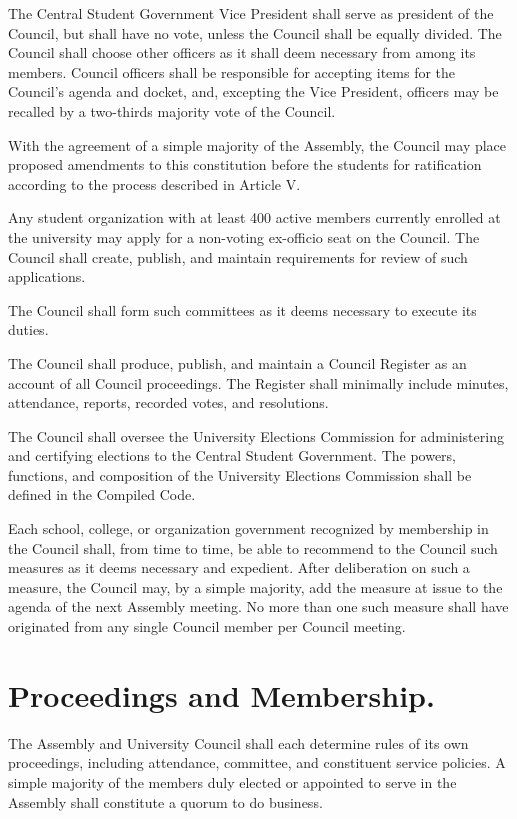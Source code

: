     The Central Student Government Vice President shall serve as president of the Council, but shall have no vote, unless the Council shall be equally divided. The Council shall choose other officers as it shall deem necessary from among its members. Council officers shall be responsible for accepting items for the Council's agenda and docket, and, excepting the Vice President, officers may be recalled by a two-thirds majority vote of the Council.
 
    With the agreement of a simple majority of the Assembly, the Council may place proposed amendments to this constitution before the students for ratification according to the process described in Article V.

    Any student organization with at least 400 active members currently enrolled at the university may apply for a non-voting ex-officio seat on the Council. The Council shall create, publish, and maintain requirements for review of such applications.

    The Council shall form such committees as it deems necessary to execute its duties.

    The Council shall produce, publish, and maintain a Council Register as an account of all Council proceedings. The Register shall minimally include minutes, attendance, reports, recorded votes, and resolutions.

    The Council shall oversee the University Elections Commission for administering and certifying elections to the Central Student Government. The powers, functions, and composition of the University Elections Commission shall be defined in the Compiled Code.

    Each school, college, or organization government recognized by membership in the Council shall, from time to time, be able to recommend to the Council such measures as it deems necessary and expedient. After deliberation on such a measure, the Council may, by a simple majority, add the measure at issue to the agenda of the next Assembly meeting. No more than one such measure shall have originated from any single Council member per Council meeting.

\section{Proceedings and Membership.}
    The Assembly and University Council shall each determine rules of its own proceedings, including attendance, committee, and constituent service policies.  A simple majority of the members duly elected or appointed to serve in the Assembly shall constitute a quorum to do business.


